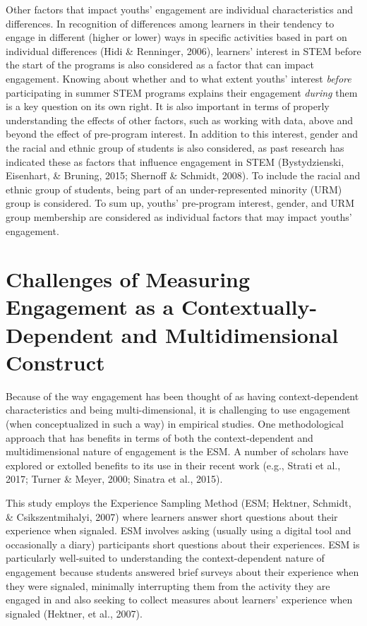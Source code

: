 \documentclass[]{msu-thesis}
\theoremstyle{definition}
\theoremstyle{definition}
\theoremstyle{definition}
\theoremstyle{remark}
\begin{document}
Other factors that impact youths' engagement are individual
characteristics and differences. In recognition of differences among
learners in their tendency to engage in different (higher or lower) ways
in specific activities based in part on individual differences (Hidi \&
Renninger, 2006), learners' interest in STEM before the start of the
programs is also considered as a factor that can impact engagement.
Knowing about whether and to what extent youths' interest \emph{before}
participating in summer STEM programs explains their engagement
\emph{during} them is a key question on its own right. It is also
important in terms of properly understanding the effects of other
factors, such as working with data, above and beyond the effect of
pre-program interest. In addition to this interest, gender and the
racial and ethnic group of students is also considered, as past research
has indicated these as factors that influence engagement in STEM
(Bystydzienski, Eisenhart, \& Bruning, 2015; Shernoff \& Schmidt, 2008).
To include the racial and ethnic group of students, being part of an
under-represented minority (URM) group is considered. To sum up, youths'
pre-program interest, gender, and URM group membership are considered as
individual factors that may impact youths' engagement.

\section{Challenges of Measuring Engagement as a Contextually-Dependent
and Multidimensional
Construct}\label{challenges-of-measuring-engagement-as-a-contextually-dependent-and-multidimensional-construct}

Because of the way engagement has been thought of as having
context-dependent characteristics and being multi-dimensional, it is
challenging to use engagement (when conceptualized in such a way) in
empirical studies. One methodological approach that has benefits in
terms of both the context-dependent and multidimensional nature of
engagement is the ESM. A number of scholars have explored or extolled
benefits to its use in their recent work (e.g., Strati et al., 2017;
Turner \& Meyer, 2000; Sinatra et al., 2015).

This study employs the Experience Sampling Method (ESM; Hektner,
Schmidt, \& Csikszentmihalyi, 2007) where learners answer short
questions about their experience when signaled. ESM involves asking
(usually using a digital tool and occasionally a diary) participants
short questions about their experiences. ESM is particularly well-suited
to understanding the context-dependent nature of engagement because
students answered brief surveys about their experience when they were
signaled, minimally interrupting them from the activity they are engaged
in and also seeking to collect measures about learners' experience when
signaled (Hektner, et al., 2007).
\end{document}
